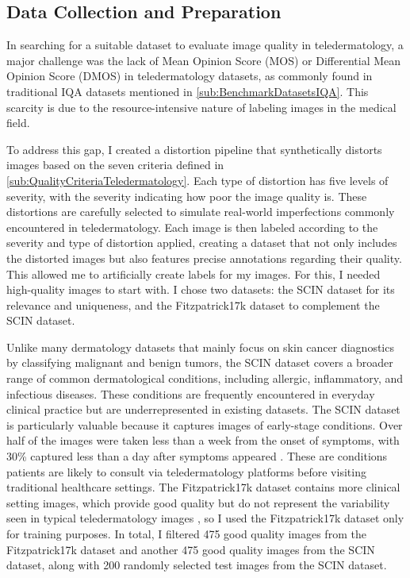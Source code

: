 \subsection{Data Collection and Preparation}
\label{sub:DataCollection}
In searching for a suitable dataset to evaluate image quality in teledermatology, a major challenge was the lack of Mean Opinion Score (MOS) or Differential Mean Opinion Score (DMOS) in teledermatology datasets, as commonly found in traditional IQA datasets mentioned in \autoref{sub:BenchmarkDatasetsIQA}. This scarcity is due to the resource-intensive nature of labeling images in the medical field. \par
\vspace{\baselineskip}
\noindent
To address this gap, I created a distortion pipeline that synthetically distorts images based on the seven criteria defined in \autoref{sub:QualityCriteriaTeledermatology}. Each type of distortion has five levels of severity, with the severity indicating how poor the image quality is. These distortions are carefully selected to simulate real-world imperfections commonly encountered in teledermatology. Each image is then labeled according to the severity and type of distortion applied, creating a dataset that not only includes the distorted images but also features precise annotations regarding their quality. This allowed me to artificially create labels for my images. For this, I needed high-quality images to start with. I chose two datasets: the SCIN dataset for its relevance and uniqueness, and the Fitzpatrick17k dataset to complement the SCIN dataset. \par
\vspace{\baselineskip}
\noindent
Unlike many dermatology datasets that mainly focus on skin cancer diagnostics by classifying malignant and benign tumors, the SCIN dataset covers a broader range of common dermatological conditions, including allergic, inflammatory, and infectious diseases. These conditions are frequently encountered in everyday clinical practice but are underrepresented in existing datasets. The SCIN dataset is particularly valuable because it captures images of early-stage conditions. Over half of the images were taken less than a week from the onset of symptoms, with 30\% captured less than a day after symptoms appeared \autocite{SCIN}. These are conditions patients are likely to consult via teledermatology platforms before visiting traditional healthcare settings. The Fitzpatrick17k dataset contains more clinical setting images, which provide good quality but do not represent the variability seen in typical teledermatology images \autocite{F17K}, so I used the Fitzpatrick17k dataset only for training purposes. In total, I filtered 475 good quality images from the Fitzpatrick17k dataset and another 475 good quality images from the SCIN dataset, along with 200 randomly selected test images from the SCIN dataset.\par
